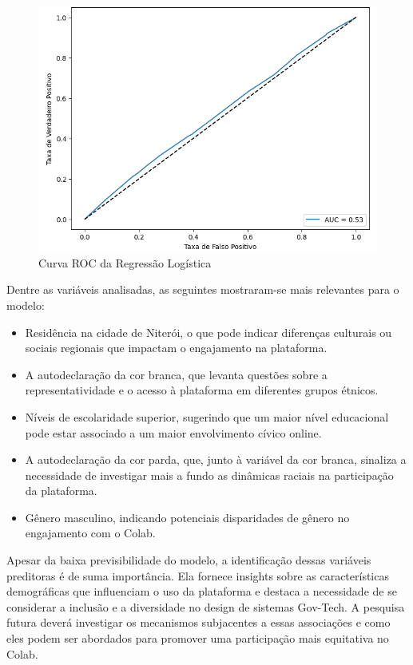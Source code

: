 \begin{figure}[!htb]
	\caption{Curva ROC da Regressão Logística}
	\label{fig:regression_roc}
	\centering
	\includegraphics[scale=0.8]{images/regression_roc.png}
\end{figure}

Dentre as variáveis analisadas, as seguintes mostraram-se mais relevantes para o modelo:

\begin{itemize}
	\item Residência na cidade de Niterói, o que pode indicar diferenças culturais ou sociais regionais que impactam o engajamento na plataforma.
	\item A autodeclaração da cor branca, que levanta questões sobre a representatividade e o acesso à plataforma em diferentes grupos étnicos.
	\item Níveis de escolaridade superior, sugerindo que um maior nível educacional pode estar associado a um maior envolvimento cívico online.
	\item A autodeclaração da cor parda, que, junto à variável da cor branca, sinaliza a necessidade de investigar mais a fundo as dinâmicas raciais na participação da plataforma.
	\item Gênero masculino, indicando potenciais disparidades de gênero no engajamento com o Colab.
\end{itemize}

Apesar da baixa previsibilidade do modelo, a identificação dessas variáveis preditoras é de suma importância. Ela fornece insights sobre as características demográficas que influenciam o uso da plataforma e destaca a necessidade de se considerar a inclusão e a diversidade no design de sistemas Gov-Tech. A pesquisa futura deverá investigar os mecanismos subjacentes a essas associações e como eles podem ser abordados para promover uma participação mais equitativa no Colab.

